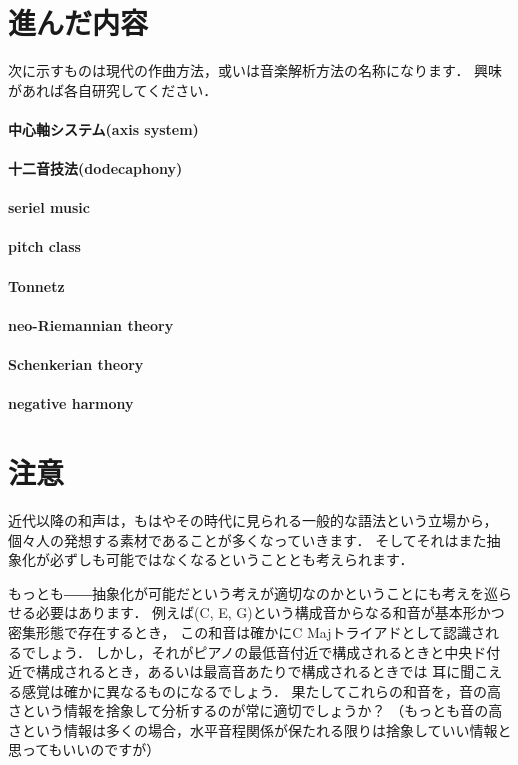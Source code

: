 \documentclass[dvipdfmx,uplatex,b5paper,openany,jbase=12Q,nomag*,textwidth-limit=44%
               ]{gachimuchi}[2020/05/05]
\begin{document}
\section{進んだ内容}
次に示すものは現代の作曲方法，或いは音楽解析方法の名称になります．
興味があれば各自研究してください．
\paragraph{中心軸システム(axis system)}
\paragraph{十二音技法(dodecaphony)}
\paragraph{seriel music}
\paragraph{pitch class}
\paragraph{Tonnetz}
\paragraph{neo-Riemannian theory}
\paragraph{Schenkerian theory}
\paragraph{negative harmony}

\section{注意}
近代以降の和声は，もはやその時代に見られる一般的な語法という立場から，
個々人の発想する素材であることが多くなっていきます．
そしてそれはまた抽象化が必ずしも可能ではなくなるということとも考えられます．

もっとも――抽象化が可能だという考えが適切なのかということにも考えを巡らせる必要はあります．
例えば(C, E, G)という構成音からなる和音が基本形かつ密集形態で存在するとき，
この和音は確かにC Majトライアドとして認識されるでしょう．
しかし，それがピアノの最低音付近で構成されるときと中央ド付近で構成されるとき，あるいは最高音あたりで構成されるときでは
耳に聞こえる感覚は確かに異なるものになるでしょう．
果たしてこれらの和音を，音の高さという情報を捨象して分析するのが常に適切でしょうか？
（もっとも音の高さという情報は多くの場合，水平音程関係が保たれる限りは捨象していい情報と思ってもいいのですが）
\end{document}
